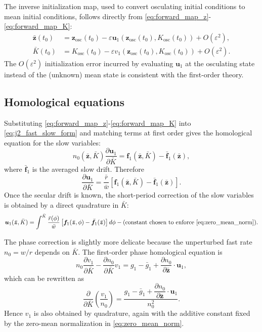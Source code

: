 \documentclass[11pt]{article}
\begin{document}
The inverse initialization map, used to convert osculating initial conditions
to mean initial conditions, follows directly from
\eqref{eq:forward_map_z}-\eqref{eq:forward_map_K}:
\begin{align}
\bar{\bm z}(t_0)
&= \bm z_{\mathrm{osc}}(t_0)
- \varepsilon \bm u_1\!\left(\bm z_{\mathrm{osc}}(t_0),K_{\mathrm{osc}}(t_0)\right)
+ O(\varepsilon^2), \label{eq:inverse_map_z}\\
\bar K(t_0)
&= K_{\mathrm{osc}}(t_0)
- \varepsilon v_1\!\left(\bm z_{\mathrm{osc}}(t_0),K_{\mathrm{osc}}(t_0)\right)
+ O(\varepsilon^2).
\label{eq:inverse_map_K}
\end{align}
The $O(\varepsilon^2)$ initialization error incurred by evaluating $\bm u_1$
at the osculating state instead of the (unknown) mean state is consistent
with the first-order theory.

\subsection{Homological equations}

Substituting \eqref{eq:forward_map_z}-\eqref{eq:forward_map_K} into
\eqref{eq:j2_fast_slow_form} and matching terms at first order gives the
homological equation for the slow variables:
\begin{equation}
n_0(\bar{\bm z},\bar K)
\frac{\partial \bm u_1}{\partial \bar K}
= \bm f_1(\bar{\bm z},\bar K)
- \bar{\bm f}_1(\bar{\bm z}),
\label{eq:homological_u}
\end{equation}
where $\bar{\bm f}_1$ is the averaged slow drift. Therefore
\begin{equation}
\frac{\partial \bm u_1}{\partial \bar K}
= \frac{\bar r}{\bar w}
\left[
\bm f_1(\bar{\bm z},\bar K)
- \bar{\bm f}_1(\bar{\bm z})
\right].
\label{eq:u_prime}
\end{equation}
Once the secular drift is known, the short-period correction of the slow
variables is obtained by a direct quadrature in $\bar K$:
\begin{equation}
\bm u_1(\bar{\bm z},\bar K)
= \int^{\bar K}
\frac{\bar r(\phi)}{\bar w}
\left[
\bm f_1(\bar{\bm z},\phi)
- \bar{\bm f}_1(\bar{\bm z})
\right] d\phi
- \text{(constant chosen to enforce \eqref{eq:zero_mean_norm})}.
\label{eq:u_integral}
\end{equation}

The phase correction is slightly more delicate because the unperturbed fast rate
$n_0=w/r$ depends on $\bar K$. The first-order phase homological equation is
\begin{equation}
n_0\frac{\partial v_1}{\partial \bar K}
- \frac{\partial n_0}{\partial \bar K}v_1
= g_1 - \bar g_1
+ \frac{\partial n_0}{\partial \bar{\bm z}}\cdot \bm u_1,
\label{eq:homological_v}
\end{equation}
which can be rewritten as
\begin{equation}
\frac{\partial}{\partial \bar K}
\left(
\frac{v_1}{n_0}
\right)
= \frac{
g_1 - \bar g_1
+ \dfrac{\partial n_0}{\partial \bar{\bm z}}\cdot \bm u_1
}{
n_0^2
}.
\label{eq:v_prime}
\end{equation}
Hence $v_1$ is also obtained by quadrature, again with the additive constant
fixed by the zero-mean normalization in \eqref{eq:zero_mean_norm}.
\end{document}
